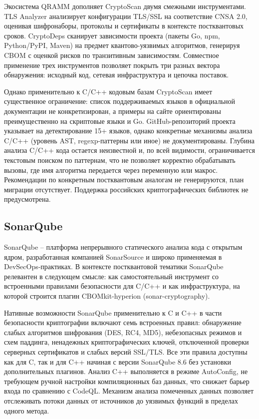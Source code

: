 \documentclass{itmo-vkr}
\begin{document}
	Экосистема QRAMM дополняет CryptoScan двумя смежными инструментами. TLS Analyzer анализирует конфигурации TLS/SSL на соответствие CNSA 2.0, оценивая шифронаборы, протоколы и сертификаты в контексте постквантовых сроков. CryptoDeps сканирует зависимости проекта (пакеты Go, npm, Python/PyPI, Maven) на предмет квантово-уязвимых алгоритмов, генерируя CBOM с оценкой рисков по транзитивным зависимостям. Совместное применение трех инструментов позволяет покрыть три разных вектора обнаружения: исходный код, сетевая инфраструктура и цепочка поставок.
	
	Однако применительно к C/C++ кодовым базам CryptoScan имеет существенное ограничение: список поддерживаемых языков в официальной документации не конкретизирован, а примеры на сайте ориентированы преимущественно на скриптовые языки и Go. GitHub-репозиторий проекта указывает на детектирование 15+ языков, однако конкретные механизмы анализа C/C++ (уровень AST, regexp-паттерны или иное) не документированы. Глубина анализа C/C++ кода остается неизвестной и, по всей видимости, ограничивается текстовым поиском по паттернам, что не позволяет корректно обрабатывать вызовы, где имя алгоритма передается через переменную или макрос. Рекомендации по конкретным постквантовым аналогам не генерируются, план миграции отсутствует. Поддержка российских криптографических библиотек не предусмотрена.
	
	\subsection{SonarQube}
	
	SonarQube -- платформа непрерывного статического анализа кода с открытым ядром, разработанная компанией SonarSource и широко применяемая в DevSecOps-практиках. В контексте постквантовой тематики SonarQube релевантен в следующем смысле: как самостоятельный инструмент со встроенными правилами безопасности для C/C++ и как инфраструктура, на которой строится плагин CBOMkit-hyperion (sonar-cryptography).
	
	Нативные возможности SonarQube применительно к C и C++ в части безопасности криптографии включают семь встроенных правил: обнаружение слабых алгоритмов шифрования (DES, RC4, MD5), небезопасных режимов и схем паддинга, ненадежных криптографических ключей, отключенной проверки серверных сертификатов и слабых версий SSL/TLS. Все эти правила доступны как для C, так и для C++ начиная с версии SonarQube 8.6 без установки дополнительных плагинов. Анализ C++ выполняется в режиме AutoConfig, не требующем ручной настройки компиляционных баз данных, что снижает барьер входа по сравнению с CodeQL. Механизм анализа помеченных данных позволяет отслеживать потоки данных от источников до уязвимых функций в пределах одного метода.
	
\end{document}
